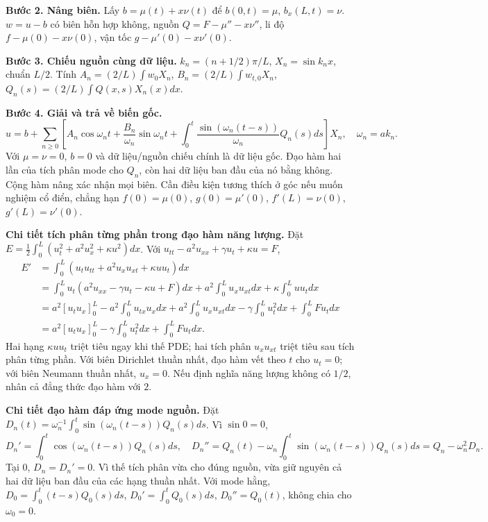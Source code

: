 \documentclass[10pt,a4paper]{article}
\begin{document}
\textbf{Bước 2. Nâng biên.} Lấy $b=\mu(t)+x\nu(t)$ để $b(0,t)=\mu$, $b_x(L,t)=\nu$. $w=u-b$ có biên hỗn hợp không, nguồn $Q=F-\mu''-x\nu''$, li độ $f-\mu(0)-x\nu(0)$, vận tốc $g-\mu'(0)-x\nu'(0)$.

\textbf{Bước 3. Chiếu nguồn cùng dữ liệu.} $k_n=(n+1/2)\pi/L$, $X_n=\sin k_nx$, chuẩn $L/2$. Tính $A_n=(2/L)\int w_0X_n$, $B_n=(2/L)\int w_{t,0}X_n$, $Q_n(s)=(2/L)\int Q(x,s)X_n(x)dx$.

\textbf{Bước 4. Giải và trả về biến gốc.}
\[u=b+\sum_{n\ge0}\left[A_n\cos\omega_nt+\frac{B_n}{\omega_n}\sin\omega_nt+\int_0^t\frac{\sin(\omega_n(t-s))}{\omega_n}Q_n(s)ds\right]X_n,\quad\omega_n=ak_n.\]
Với $\mu=\nu=0$, $b=0$ và dữ liệu/nguồn chiếu chính là dữ liệu gốc. Đạo hàm hai lần của tích phân mode cho $Q_n$, còn hai dữ liệu ban đầu của nó bằng không. Cộng hàm nâng xác nhận mọi biên. Cần điều kiện tương thích ở góc nếu muốn nghiệm cổ điển, chẳng hạn $f(0)=\mu(0)$, $g(0)=\mu'(0)$, $f'(L)=\nu(0)$, $g'(L)=\nu'(0)$.

\textbf{Chi tiết tích phân từng phần trong đạo hàm năng lượng.} Đặt $E=\frac12\int_0^L(u_t^2+a^2u_x^2+\kappa u^2)dx$. Với $u_{tt}-a^2u_{xx}+\gamma u_t+\kappa u=F$,
\[\begin{aligned}
E'&=\int_0^L(u_tu_{tt}+a^2u_xu_{xt}+\kappa uu_t)dx\\
&=\int_0^Lu_t(a^2u_{xx}-\gamma u_t-\kappa u+F)dx
+a^2\int_0^Lu_xu_{xt}dx+\kappa\int_0^Luu_tdx\\
&=a^2[u_tu_x]_0^L-a^2\int_0^Lu_{tx}u_xdx
+a^2\int_0^Lu_xu_{xt}dx-\gamma\int_0^Lu_t^2dx+\int_0^LFu_tdx\\
&=a^2[u_tu_x]_0^L-\gamma\int_0^Lu_t^2dx+\int_0^LFu_tdx.
\end{aligned}\]
Hai hạng $\kappa uu_t$ triệt tiêu ngay khi thế PDE; hai tích phân $u_xu_{xt}$ triệt tiêu sau tích phân từng phần. Với biên Dirichlet thuần nhất, đạo hàm vết theo $t$ cho $u_t=0$; với biên Neumann thuần nhất, $u_x=0$. Nếu định nghĩa năng lượng không có $1/2$, nhân cả đẳng thức đạo hàm với $2$.

\textbf{Chi tiết đạo hàm đáp ứng mode nguồn.} Đặt $D_n(t)=\omega_n^{-1}\int_0^t\sin(\omega_n(t-s))Q_n(s)ds$. Vì $\sin0=0$,
\[D_n'=\int_0^t\cos(\omega_n(t-s))Q_n(s)ds,\quad
D_n''=Q_n(t)-\omega_n\int_0^t\sin(\omega_n(t-s))Q_n(s)ds=Q_n-\omega_n^2D_n.\]
Tại $0$, $D_n=D_n'=0$. Vì thế tích phân vừa cho đúng nguồn, vừa giữ nguyên cả hai dữ liệu ban đầu của các hạng thuần nhất. Với mode hằng, $D_0=\int_0^t(t-s)Q_0(s)ds$, $D_0'=\int_0^tQ_0(s)ds$, $D_0''=Q_0(t)$, không chia cho $\omega_0=0$.
\end{document}

